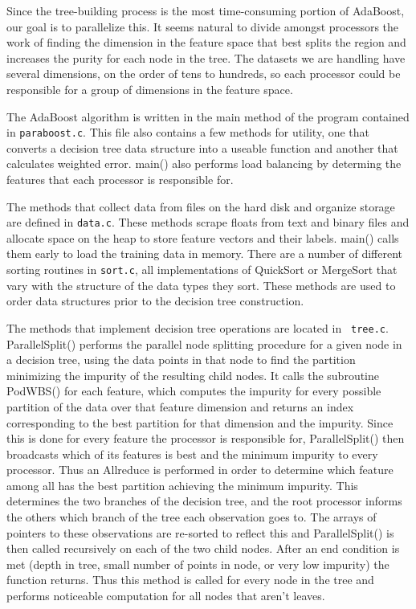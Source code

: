 \documentclass[12pt]{article}
\begin{document}
Since the tree-building process is the most time-consuming portion of AdaBoost,
our goal is to parallelize this. It seems natural to divide amongst processors
the work of finding the dimension in the feature space that best splits the
region and increases the purity for each node in the tree. The datasets we are
handling have several dimensions, on the order of tens to hundreds, so each
processor could be responsible for a group of dimensions in the feature space.

The AdaBoost algorithm is written in the main method of the program contained
in {\tt paraboost.c}. This file also contains a few methods for utility, one
that converts a decision tree data structure into a useable function and
another that calculates weighted error. main() also performs load balancing by
determing the features that each processor is responsible for. 

The methods that collect data from files on the hard disk and organize storage
are defined in {\tt data.c}. These methods scrape floats from text and binary
files and allocate space on the heap to store feature vectors and their labels.
main() calls them early to load the training data in memory. There are a number
of different sorting routines in {\tt sort.c}, all implementations of QuickSort
or MergeSort that vary with the structure of the data types they sort. These
methods are used to order data structures prior to the decision tree
construction.

The methods that implement decision tree operations are located in {\tt
tree.c}. ParallelSplit() performs the parallel node splitting procedure for a
given node in a decision tree, using the data points in that node to find the
partition minimizing the impurity of the resulting child nodes. It calls the
subroutine PodWBS() for each feature, which computes the impurity for every
possible partition of the data over that feature dimension and returns an index
corresponding to the best partition for that dimension and the impurity. Since
this is done for every feature the processor is responsible for,
ParallelSplit() then broadcasts which of its features is best and the minimum
impurity to every processor. Thus an Allreduce is performed in order to
determine which feature among all has the best partition achieving the minimum
impurity. This determines the two branches of the decision tree, and the root
processor informs the others which branch of the tree each observation goes to.
The arrays of pointers to these observations are re-sorted to reflect this and
ParallelSplit() is then called recursively on each of the two child nodes.
After an end condition is met (depth in tree, small number of points
in node, or very low impurity) the function returns. Thus this method is called for every node in the tree and performs noticeable computation for all nodes that aren't leaves.
\end{document}
